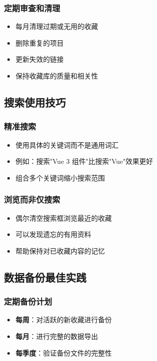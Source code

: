 \documentclass[10pt,a4paper]{article}
\begin{document}
\begin{itemize}
\begin{itemize}
\begin{itemize}
\begin{itemize}
\begin{enumerate}
\begin{itemize}
\subsubsection{定期审查和清理}
\begin{itemize}
  \item 每月清理过期或无用的收藏
  \item 删除重复的项目
  \item 更新失效的链接
  \item 保持收藏库的质量和相关性
\end{itemize}

\subsection{搜索使用技巧}

\subsubsection{精准搜索}
\begin{itemize}
  \item 使用具体的关键词而不是通用词汇
  \item 例如：搜索"Vue 3 组件"比搜索"Vue"效果更好
  \item 组合多个关键词缩小搜索范围
\end{itemize}

\subsubsection{浏览而非仅搜索}
\begin{itemize}
  \item 偶尔清空搜索框浏览最近的收藏
  \item 可以发现遗忘的有用资料
  \item 帮助保持对已收藏内容的记忆
\end{itemize}

\subsection{数据备份最佳实践}

\subsubsection{定期备份计划}
\begin{itemize}
  \item \textbf{每周}：对活跃的新收藏进行备份
  \item \textbf{每月}：进行完整的数据导出
  \item \textbf{每季度}：验证备份文件的完整性
\end{itemize}


\end{itemize}
\end{enumerate}
\end{itemize}
\end{itemize}
\end{itemize}
\end{itemize}
\end{document}

